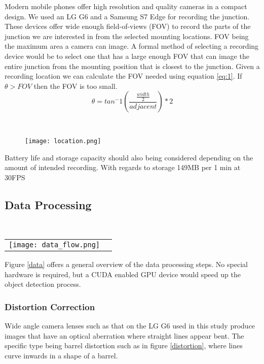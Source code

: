 Modern mobile phones offer high resolution and quality cameras in a compact design. We used an LG G6 and a Samsung S7 Edge for recording the junction.
These devices offer wide enough field-of-views (FOV) to record the parts of the junction we are interested in from the selected mounting locations.
FOV being the maximum area a camera can image. A formal method of selecting a recording device would be to select one that has a large enough FOV that can image the entire junction 
from the mounting position that is closest to the junction. Given a recording location we can calculate the FOV needed using equation \ref{eq:1}.
If $\theta > FOV$ then the FOV is too small.
\begin{equation}
    \theta = tan^-1(\frac{\frac{width}{2}}{adjacent}) * 2\label{eq:1}
  \end{equation}

\ \\ 
  \begin{figure}[h]
    \texttt{[image: location.png]}
    \centering 
    \end{figure}
    \label{Camera location}

Battery life and storage capacity should also being considered depending on the amount of intended recording. 
With regards to storage 149MB per 1 min at 30FPS

\subsection{Data Processing}

\ \\ 
\noindent
\begin{tabular}{@{}cc}
\texttt{[image: data\_flow.png]} 
\end{tabular}
\label{data}


Figure \ref{data} offers a general overview of the data processing steps. No special hardware is required, but a CUDA enabled GPU
device would speed up the object detection process.
\ \\
\subsubsection{Distortion Correction}

Wide angle camera lenses such as that on the LG G6 used in this study produce images that have an optical aberration where straight lines appear bent. 
The specific type being barrel distortion such as in figure \ref{distortion}, where lines curve inwards in a shape of a barrel.

